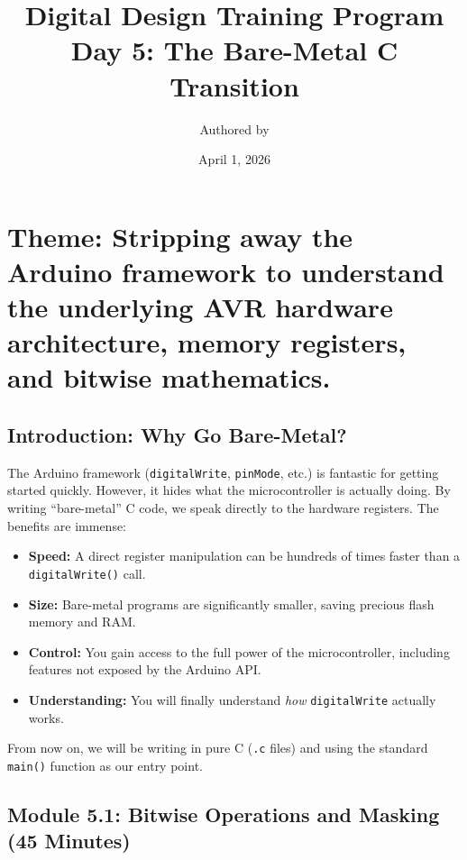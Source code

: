 \documentclass[11pt,a4paper]{article}
\title{Digital Design Training Program \\ \large Day 5: The Bare-Metal C Transition}
\author{Authored by }
\date{April 1, 2026}
\begin{document}
\maketitle

\section*{Theme: Stripping away the Arduino framework to understand the underlying AVR hardware architecture, memory registers, and bitwise mathematics.}

\subsection*{Introduction: Why Go Bare-Metal?}
The Arduino framework (\verb|digitalWrite|, \verb|pinMode|, etc.) is fantastic for getting started quickly. However, it hides what the microcontroller is actually doing. By writing ``bare-metal'' C code, we speak directly to the hardware registers. The benefits are immense:
\begin{itemize}
    \item \textbf{Speed:} A direct register manipulation can be hundreds of times faster than a \verb|digitalWrite()| call.
    \item \textbf{Size:} Bare-metal programs are significantly smaller, saving precious flash memory and RAM.
    \item \textbf{Control:} You gain access to the full power of the microcontroller, including features not exposed by the Arduino API.
    \item \textbf{Understanding:} You will finally understand \emph{how} \verb|digitalWrite| actually works.
\end{itemize}
From now on, we will be writing in pure C (\verb|.c| files) and using the standard \verb|main()| function as our entry point.

\subsection*{Module 5.1: Bitwise Operations and Masking (45 Minutes)}
\end{document}
